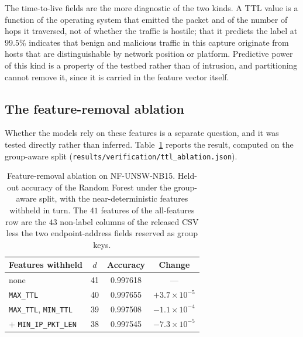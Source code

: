 \documentclass[11pt,a4paper]{article}
\begin{document}
The time-to-live fields are the more diagnostic of the two kinds. A TTL
value is a function of the operating system that emitted the packet and
of the number of hops it traversed, not of whether the traffic is
hostile; that it predicts the label at $99.5\%$ indicates that benign
and malicious traffic in this capture originate from hosts that are
distinguishable by network position or platform. Predictive power of
this kind is a property of the testbed rather than of intrusion, and
partitioning cannot remove it, since it is carried in the feature
vector itself.

\subsection{The feature-removal ablation}

Whether the models rely on these features is a separate question, and
it was tested directly rather than inferred. Table~\ref{tab:ablation}
reports the result, computed on the group-aware split
(\texttt{results/verification/ttl\_ablation.json}).

\begin{table}[h]
\centering
\caption{Feature-removal ablation on NF-UNSW-NB15. Held-out accuracy of
the Random Forest under the group-aware split, with the
near-deterministic features withheld in turn. The $41$ features of the
all-features row are the $43$ non-label columns of the released CSV
less the two endpoint-address fields reserved as group keys.}
\label{tab:ablation}
\small
\begin{tabular}{@{}lccc@{}}
\toprule
Features withheld & $d$ & Accuracy & Change \\
\midrule
none                                   & 41 & 0.997618 & --- \\
\texttt{MAX\_TTL}                      & 40 & 0.997655 & $+3.7\times10^{-5}$ \\
\texttt{MAX\_TTL}, \texttt{MIN\_TTL}   & 39 & 0.997508 & $-1.1\times10^{-4}$ \\
\;\;+ \texttt{MIN\_IP\_PKT\_LEN}       & 38 & 0.997545 & $-7.3\times10^{-5}$ \\
\bottomrule
\end{tabular}
\end{table}
\end{document}
